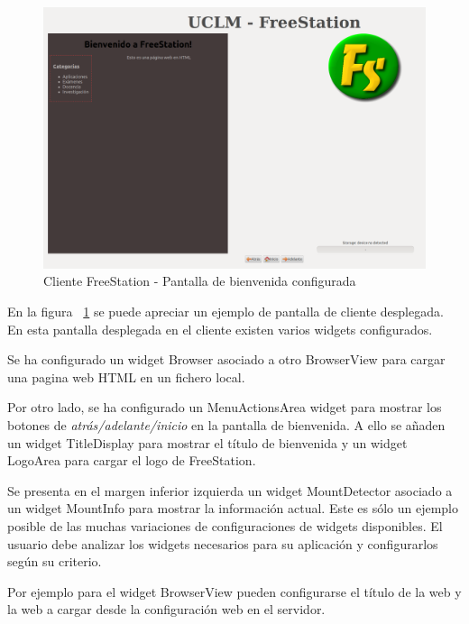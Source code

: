 \begin{figure}[ht]
    \begin{center}
        \includegraphics[width=460px]{src/img/welcome-client-widgets.png}
        \caption[Cliente FreeStation - Pantalla de bienvenida configurada] {Cliente FreeStation - Pantalla de bienvenida configurada}
        \label{fig:screendeploy}
    \end{center}
\end{figure}

En la figura ~\ref{fig:screendeploy} se puede apreciar un ejemplo de
pantalla de cliente desplegada. En esta pantalla desplegada en el cliente
existen varios widgets configurados.

Se ha configurado un widget Browser asociado a otro BrowserView para cargar una
pagina web HTML en un fichero local.

Por otro lado, se ha configurado un MenuActionsArea widget para mostrar los
botones de \emph{atrás/adelante/inicio} en la pantalla de bienvenida. A ello se
añaden un widget TitleDisplay para mostrar el título de bienvenida y un widget LogoArea
para cargar el logo de FreeStation.

Se presenta en el margen inferior izquierda un widget MountDetector asociado a
un widget MountInfo para mostrar la información actual. Este es sólo un ejemplo
posible de las muchas variaciones de configuraciones de widgets disponibles.
El usuario debe analizar los widgets necesarios para su aplicación y
configurarlos según su criterio.

\newpage

Por ejemplo para el widget BrowserView pueden configurarse el título de la web y
la web a cargar desde la configuración web en el servidor.

